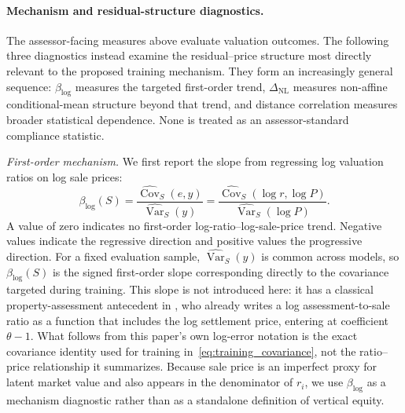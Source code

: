 \documentclass[10pt]{article}
\theoremstyle{definition}
\newcommand{\1}{\mathbf{1}}
\begin{document}
\paragraph{
Mechanism and residual-structure diagnostics.}
{The assessor-facing measures above evaluate valuation outcomes. The following three
diagnostics instead examine the residual--price structure most directly relevant to
the proposed training mechanism. They form an increasingly general sequence:
$\beta_{\log}$ measures the targeted first-order trend, $\Delta_{\mathrm{NL}}$
measures non-affine conditional-mean structure beyond that trend, and distance
correlation measures broader statistical dependence. None is treated as an
assessor-standard compliance statistic.

\emph{First-order mechanism.}
We first report the slope from regressing log valuation ratios on log sale prices:
\begin{equation}
\label{eq:log_ratio_slope}
\beta_{\log}(S)
=
\frac{
\widehat{\operatorname{Cov}}_S(e,y)
}{
\widehat{\operatorname{Var}}_S(y)
}
=
\frac{
\widehat{\operatorname{Cov}}_S(\log r,\log P)
}{
\widehat{\operatorname{Var}}_S(\log P)
}.
\end{equation}
A value of zero indicates no first-order log-ratio--log-sale-price trend. Negative
values indicate the regressive direction and positive values the progressive
direction. For a fixed evaluation sample, $\widehat{\operatorname{Var}}_S(y)$ is
common across models, so $\beta_{\log}(S)$ is the signed first-order slope
corresponding directly to the covariance targeted during training.
This slope is not introduced here: it has a classical
property-assessment antecedent in \textcite{Cheng1974}, who already writes a log
assessment-to-sale ratio as a function that includes the log settlement price,
entering at coefficient $\theta-1$. What follows from this
paper's own log-error notation is the exact covariance identity used for training
in~\eqref{eq:training_covariance}, not the ratio--price relationship it summarizes.
Because sale
price is an imperfect proxy for latent market value and also appears in the
denominator of $r_i$, we use $\beta_{\log}$ as a mechanism diagnostic rather than
as a standalone definition of vertical equity.

}
\end{document}
